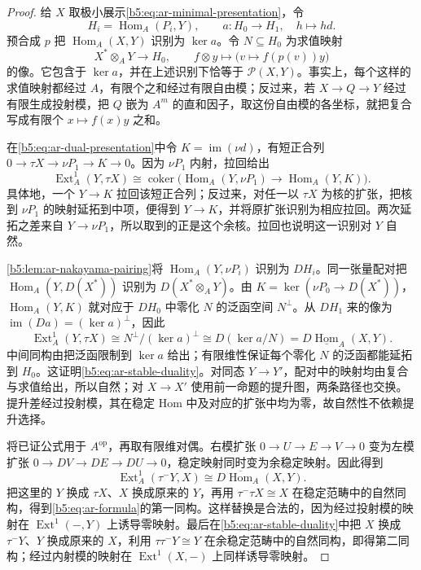 \begin{proof}
	给 \(X\) 取极小展示\eqref{b5:eq:ar-minimal-presentation}，令
	\[
		H_i=\operatorname{Hom}_A(P_i,Y),\qquad
		a:H_0\to H_1,\quad h\mapsto hd.
	\]
	预合成 \(p\) 把 \(\operatorname{Hom}_A(X,Y)\) 识别为 \(\ker a\)。令 \(N\subseteq H_0\) 为求值映射
	\[
		X^*\otimes_A Y\longrightarrow H_0,
		\qquad f\otimes y\longmapsto\bigl(v\mapsto f(p(v))y\bigr)
	\]
	的像。它包含于 \(\ker a\)，并在上述识别下恰等于 \(\mathcal P(X,Y)\)。事实上，每个这样的求值映射都经过 \(A\)，有限个之和经过有限自由模；反过来，若 \(X\to Q\to Y\) 经过有限生成投射模，把 \(Q\) 嵌为 \(A^m\) 的直和因子，取这份自由模的各坐标，就把复合写成有限个 \(x\mapsto f(x)y\) 之和。

	在\eqref{b5:eq:ar-dual-presentation}中令 \(K=\operatorname{im}(\nu d)\)，有短正合列 \(0\to\tau X\to\nu P_1\to K\to0\)。因为 \(\nu P_1\) 内射，拉回给出
	\[
		\operatorname{Ext}_A^1(Y,\tau X)
		\cong\operatorname{coker}\bigl(
		\operatorname{Hom}_A(Y,\nu P_1)\to\operatorname{Hom}_A(Y,K)\bigr).
	\]
	具体地，一个 \(Y\to K\) 拉回该短正合列；反过来，对任一以 \(\tau X\) 为核的扩张，把核到 \(\nu P_1\) 的映射延拓到中项，便得到 \(Y\to K\)，并将原扩张识别为相应拉回。两次延拓之差来自 \(Y\to\nu P_1\)，所以取到的正是这个余核。拉回也说明这一识别对 \(Y\) 自然。

	\cref{b5:lem:ar-nakayama-pairing}将 \(\operatorname{Hom}_A(Y,\nu P_i)\) 识别为 \(DH_i\)。同一张量配对把 \(\operatorname{Hom}_A(Y,D(X^*))\) 识别为 \(D(X^*\otimes_A Y)\)。由 \(K=\ker(\nu P_0\to D(X^*))\)，\(\operatorname{Hom}_A(Y,K)\) 就对应于 \(DH_0\) 中零化 \(N\) 的泛函空间 \(N^\perp\)。从 \(DH_1\) 来的像为 \(\operatorname{im}(Da)=(\ker a)^\perp\)，因此
	\[
		\operatorname{Ext}_A^1(Y,\tau X)
		\cong N^\perp/(\ker a)^\perp
		\cong D(\ker a/N)
		=D\underline{\operatorname{Hom}}_A(X,Y).
	\]
	中间同构由把泛函限制到 \(\ker a\) 给出；有限维性保证每个零化 \(N\) 的泛函都能延拓到 \(H_0\)。这证明\eqref{b5:eq:ar-stable-duality}。对同态 \(Y\to Y'\)，配对中的映射均由复合与求值给出，所以自然；对 \(X\to X'\) 使用前一命题的提升图，两条路径也交换。提升差经过投射模，其在稳定 Hom 中及对应的扩张中均为零，故自然性不依赖提升选择。

	将已证公式用于 \(A^{\mathrm{op}}\)，再取有限维对偶。右模扩张 \(0\to U\to E\to V\to0\) 变为左模扩张 \(0\to DV\to DE\to DU\to0\)，稳定映射同时变为余稳定映射。因此得到
	\[
		\operatorname{Ext}_A^1(\tau^-Y,X)
		\cong D\overline{\operatorname{Hom}}_A(X,Y).
	\]
	把这里的 \(Y\) 换成 \(\tau X\)、\(X\) 换成原来的 \(Y\)，再用 \(\tau^-\tau X\cong X\) 在稳定范畴中的自然同构，得到\eqref{b5:eq:ar-formula}的第一同构。这样替换是合法的，因为经过投射模的映射在 \(\operatorname{Ext}^1(-,Y)\) 上诱导零映射。最后在\eqref{b5:eq:ar-stable-duality}中把 \(X\) 换成 \(\tau^-Y\)、\(Y\) 换成原来的 \(X\)，利用 \(\tau\tau^-Y\cong Y\) 在余稳定范畴中的自然同构，即得第二同构；经过内射模的映射在 \(\operatorname{Ext}^1(X,-)\) 上同样诱导零映射。
\end{proof}


